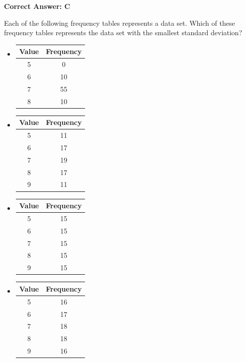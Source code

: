 \documentclass{article}
\begin{document}
\begin{tcolorbox}[colback=green!10, colframe=green!50!black,title=Answer to Question 14]
\textbf{Correct Answer: C}  
\end{tcolorbox}

\vspace{20pt}

\begin{tcolorbox}[colback=blue!5!white,colframe=blue!75!black,title=Question 15]
Each of the following frequency tables represents a data set. Which of these frequency tables represents the data set with the smallest standard deviation?

\begin{itemize}
    \item[A.]
    \begin{tabular}{|c|c|}
    \hline
    Value & Frequency \\
    \hline
    5  & 0  \\
    6  & 10  \\
    7  & 55  \\
    8  & 10  \\
    \hline
    \end{tabular}
    
    \item[B.]
    \begin{tabular}{|c|c|}
    \hline
    Value & Frequency \\
    \hline
    5  & 11  \\
    6  & 17  \\
    7  & 19  \\
    8  & 17  \\
    9  & 11  \\
    \hline
    \end{tabular}
    
    \item[C.]
    \begin{tabular}{|c|c|}
    \hline
    Value & Frequency \\
    \hline
    5  & 15  \\
    6  & 15  \\
    7  & 15  \\
    8  & 15  \\
    9  & 15  \\
    \hline
    \end{tabular}

        \item[D.]
    \begin{tabular}{|c|c|}
    \hline
    Value & Frequency \\
    \hline
    5  & 16  \\
    6  & 17  \\
    7  & 18  \\
    8  & 18  \\
    9  & 16  \\
    \hline
    \end{tabular}
\end{itemize}
\end{tcolorbox}
\end{document}
